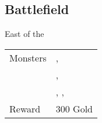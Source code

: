 \subsection{Battlefield}
\label{map:battlefield_05}

East of the 

\begin{longtable}{ l p{9cm} }
	Monsters
	& \nameref{monster:mint_mint}, \nameref{monster:mint_mint} \\
	& \nameref{monster:giant_toad}, \nameref{monster:giant_toad} \\
	& \nameref{monster:giant_toad}, \nameref{monster:giant_toad}, \nameref{monster:mint_mint}
\\
	Reward & 300 Gold
\end{longtable}
